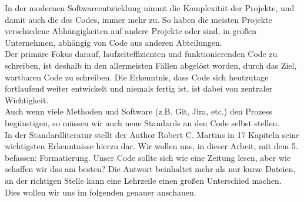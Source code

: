 In der modernen Softwareentwicklung nimmt die Komplexität der Projekte, und damit auch die des Codes, immer mehr zu.
So haben die meisten Projekte verschiedene Abhängigkeiten auf andere Projekte oder sind, in großen Unternehmen, abhängig von Code aus anderen Abteilungen.\\
Der primäre Fokus darauf, laufzeiteffizienten und funktionierenden Code zu schreiben, ist deshalb in den allermeisten Fällen abgelöst worden, durch das Ziel, wartbaren Code zu schreiben.
Die Erkenntnis, dass Code sich heutzutage fortlaufend weiter entwickelt und niemals fertig ist, ist dabei von zentraler Wichtigkeit.\\
Auch wenn viele Methoden und Software (z.B. Git, Jira, etc.) den Prozess  begünstigen, so müssen wir auch neue Standards an den Code selbst stellen.\\
In der Standardliteratur  stellt der Author Robert C. Martins in 17 Kapiteln seine wichtigsten Erkenntnisse hierzu dar.
Wir wollen uns, in dieser Arbeit, mit dem 5. befassen: Formatierung.
Unser Code sollte sich wie eine Zeitung lesen, aber wie schaffen wir das am besten?
Die Antwort beinhaltet mehr als nur kurze Dateien, an der richtigen Stelle kann eine Lehrzeile einen großen Unterschied machen.\\
Dies wollen wir uns im folgenden genauer anschauen.
